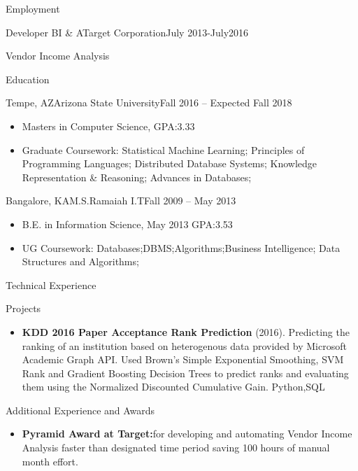 \documentclass[]{nakulcv}
\begin{document}
\begin{cvsection}{Employment}
\begin{cvsubsection}{Developer BI \& A}{Target Corporation}{July 2013-July2016}
\begin{cvsubsection}{Vendor Income Analysis}{}{}
\begin{itemize}
				\end{itemize}
			\end{cvsubsection}
		\end{cvsubsection}
	\begin{cvsection}{Education}
		\begin{cvsubsection}{Tempe, AZ}{Arizona State University}{Fall 2016 -- Expected Fall 2018}
			\begin{itemize}
				\item Masters in Computer Science, GPA:3.33
				\item Graduate Coursework: Statistical Machine Learning; Principles of Programming Languages; Distributed Database Systems; Knowledge Representation \& Reasoning; Advances in Databases;
			\end{itemize}
		\end{cvsubsection}
		\begin{cvsubsection}{Bangalore, KA}{M.S.Ramaiah I.T}{Fall 2009 -- May 2013}
			\begin{itemize}
				\item B.E. in Information Science, May 2013 GPA:3.53
				\item UG Coursework: Databases;DBMS;Algorithms;Business Intelligence; Data Structures and Algorithms;
			\end{itemize}
		\end{cvsubsection}
	\end{cvsection}
	\begin{cvsection}{Technical Experience}
		\begin{cvsubsection}{Projects}{}{}
			\begin{itemize}
				\item \textbf{KDD 2016 Paper Acceptance Rank Prediction} (2016). Predicting the ranking of an institution based on heterogenous data provided by Microsoft Academic Graph API. Used Brown's Simple Exponential Smoothing, SVM Rank and Gradient Boosting Decision Trees to predict ranks and evaluating them using the Normalized Discounted Cumulative Gain. Python,SQL 
			\end{itemize}
		\end{cvsubsection}
	\end{cvsection}
	\begin{cvsection}{Additional Experience and Awards}
		\begin{cvsubsection}{}{}{}	
			\begin{itemize}
				\item \textbf{Pyramid Award at Target:}for developing and automating Vendor Income Analysis faster than designated time period saving 100 hours of manual month effort.

\end{itemize}
\end{cvsubsection}
\end{cvsection}
\end{cvsection}
\end{document}
